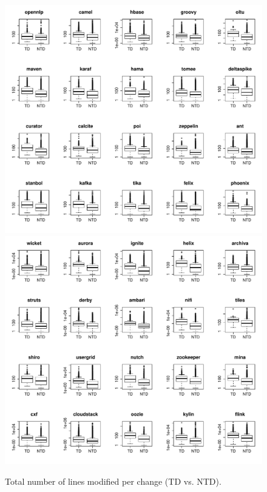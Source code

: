 \begin{figure}[tb]
	\centering
	\includegraphics[width=120mm]{figures/chapter4/rq3_td_churn_logged_1}
	\includegraphics[width=120mm]{figures/chapter4/rq3_td_churn_logged_2}
	\caption{Total number of lines modified per change (TD vs. NTD).}
	\label{figure:total_number_of_lines_changed_td_vs_ntd}
\end{figure}


